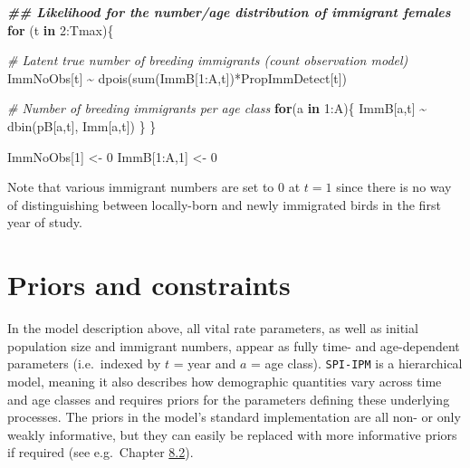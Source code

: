 \documentclass[
]{book}
\newenvironment{Shaded}{\begin{snugshade}}{\end{snugshade}}
\newcommand{\CommentTok}[1]{\textcolor[rgb]{0.56,0.35,0.01}{\textit{#1}}}
\newcommand{\ControlFlowTok}[1]{\textcolor[rgb]{0.13,0.29,0.53}{\textbf{#1}}}
\newcommand{\DecValTok}[1]{\textcolor[rgb]{0.00,0.00,0.81}{#1}}
\newcommand{\DocumentationTok}[1]{\textcolor[rgb]{0.56,0.35,0.01}{\textbf{\textit{#1}}}}
\newcommand{\FunctionTok}[1]{\textcolor[rgb]{0.00,0.00,0.00}{#1}}
\newcommand{\NormalTok}[1]{#1}
\newcommand{\OtherTok}[1]{\textcolor[rgb]{0.56,0.35,0.01}{#1}}
\newcommand{\SpecialCharTok}[1]{\textcolor[rgb]{0.00,0.00,0.00}{#1}}
\begin{document}
\begin{Shaded}
\begin{Highlighting}[]
\DocumentationTok{\#\# Likelihood for the number/age distribution of immigrant females}
\ControlFlowTok{for}\NormalTok{ (t }\ControlFlowTok{in} \DecValTok{2}\SpecialCharTok{:}\NormalTok{Tmax)\{}

  \CommentTok{\# Latent true number of breeding immigrants (count observation model)}
\NormalTok{  ImmNoObs[t] }\SpecialCharTok{\textasciitilde{}} \FunctionTok{dpois}\NormalTok{(}\FunctionTok{sum}\NormalTok{(ImmB[}\DecValTok{1}\SpecialCharTok{:}\NormalTok{A,t])}\SpecialCharTok{*}\NormalTok{PropImmDetect[t])}

  \CommentTok{\# Number of breeding immigrants per age class}
  \ControlFlowTok{for}\NormalTok{(a }\ControlFlowTok{in} \DecValTok{1}\SpecialCharTok{:}\NormalTok{A)\{}
\NormalTok{    ImmB[a,t] }\SpecialCharTok{\textasciitilde{}} \FunctionTok{dbin}\NormalTok{(pB[a,t], Imm[a,t])}
\NormalTok{  \}}
\NormalTok{\}}

\NormalTok{ImmNoObs[}\DecValTok{1}\NormalTok{] }\OtherTok{\textless{}{-}} \DecValTok{0}
\NormalTok{ImmB[}\DecValTok{1}\SpecialCharTok{:}\NormalTok{A,}\DecValTok{1}\NormalTok{] }\OtherTok{\textless{}{-}} \DecValTok{0}
\end{Highlighting}
\end{Shaded}

Note that various immigrant numbers are set to 0 at \(t=1\) since there is no way of distinguishing between locally-born and newly immigrated birds in the first year of study.

\hypertarget{priors-and-constraints}{%
\section{Priors and constraints}\label{priors-and-constraints}}

In the model description above, all vital rate parameters, as well as initial
population size and immigrant numbers, appear as fully time- and age-dependent
parameters (i.e.~indexed by \(t\) = year and \(a\) = age class). \texttt{SPI-IPM} is a
hierarchical model, meaning it also describes how demographic quantities vary
across time and age classes and requires priors for the parameters defining
these underlying processes. The priors in the model's standard implementation
are all non- or only weakly informative, but they can easily be replaced with
more informative priors if required (see e.g.~Chapter \protect\hyperlink{ux5cux23ux5cux2520Includingux5cux2520additionalux5cux2520dataux5cux2520andux5cux2520informativeux5cux2520priors}{8.2}).
\end{document}
